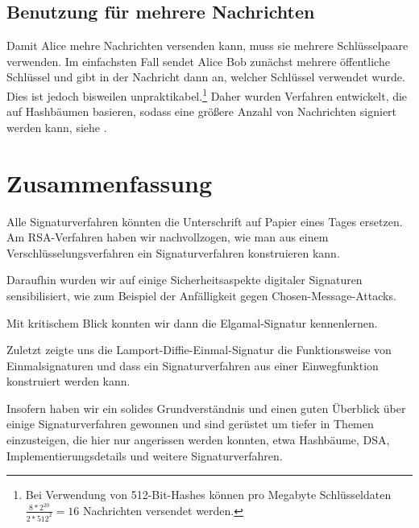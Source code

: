 \documentclass[a4paper,12pt,oneside]{scrreprt}
\begin{document}
\section{Benutzung für mehrere Nachrichten}

Damit Alice mehre Nachrichten versenden kann, muss sie mehrere Schlüsselpaare verwenden. Im einfachsten Fall sendet Alice Bob zunächst mehrere öffentliche Schlüssel und gibt in der Nachricht dann an, welcher Schlüssel verwendet wurde. Dies ist jedoch bisweilen unpraktikabel.\footnote {Bei Verwendung von 512-Bit-Hashes können pro Megabyte Schlüsseldaten $\frac{8*2^{20}}{2*512^2} = 16$ Nachrichten versendet werden.} Daher wurden Verfahren entwickelt, die auf Hashbäumen basieren, sodass eine größere Anzahl von Nachrichten signiert werden kann, siehe \cite{bernstein2009post}. 





\chapter{Zusammenfassung}

Alle Signaturverfahren könnten die Unterschrift auf Papier eines Tages ersetzen. Am RSA-Verfahren haben wir nachvollzogen, wie man aus einem Verschlüsselungsverfahren ein Signaturverfahren konstruieren kann.

Daraufhin wurden wir auf einige Sicherheitsaspekte digitaler Signaturen sensibilisiert, wie zum Beispiel der Anfälligkeit gegen Chosen-Message-Attacks.

Mit kritischem Blick konnten wir dann die Elgamal-Signatur kennenlernen.

Zuletzt zeigte uns die Lamport-Diffie-Einmal-Signatur die Funktionsweise von Einmalsignaturen und dass ein Signaturverfahren aus einer Einwegfunktion konstruiert werden kann.

Insofern haben wir ein solides Grundverständnis und einen guten Überblick über einige Signaturverfahren gewonnen und sind gerüstet um tiefer in Themen einzusteigen, die hier nur angerissen werden konnten, etwa Hashbäume, DSA, Implementierungsdetails und weitere Signaturverfahren. 





\end{document}
